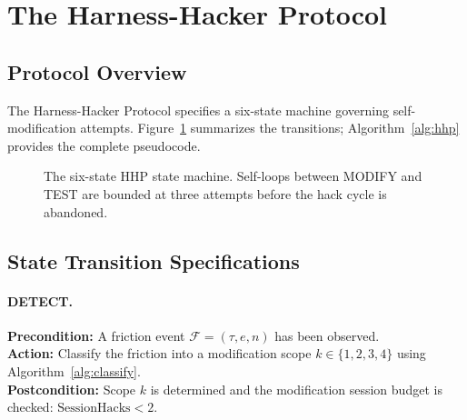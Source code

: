\section{The Harness-Hacker Protocol}

\label{sec:protocol}

\subsection{Protocol Overview}
\label{sec:protocol-overview}

The Harness-Hacker Protocol specifies a six-state machine governing
self-modification attempts. Figure~\ref{fig:state-machine} summarizes the
transitions; Algorithm~\ref{alg:hhp} provides the complete pseudocode.

\begin{figure}[H]
\centering
\setlength{\fboxsep}{8pt}
\caption{The six-state HHP state machine. Self-loops between MODIFY and TEST
are bounded at three attempts before the hack cycle is abandoned.}
\label{fig:state-machine}
\end{figure}

\subsection{State Transition Specifications}
\label{sec:transitions}

\paragraph{DETECT.}
\textbf{Precondition:} A friction event $\mathcal{F} = (\tau, e, n)$ has been
observed. \\
\textbf{Action:} Classify the friction into a modification scope
$k \in \{1, 2, 3, 4\}$ using Algorithm~\ref{alg:classify}. \\
\textbf{Postcondition:} Scope $k$ is determined and the modification session
budget is checked: $\text{SessionHacks} < 2$.

